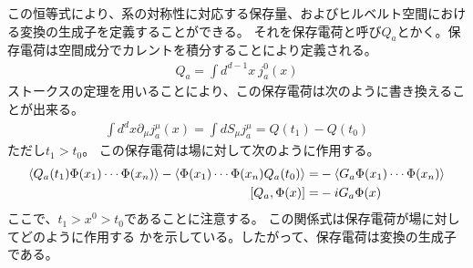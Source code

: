 \documentclass[11pt, dvipdfmx]{article}
\numberwithin{equation}{section}
\begin{document}
この恒等式により、系の対称性に対応する保存量、およびヒルベルト空間における変換の生成子を定義することができる。
それを保存電荷と呼び$Q_a$とかく。保存電荷は空間成分でカレントを積分することにより定義される。
\begin{align}
    Q_a=\int d^{d-1}x \ j_a^0(x)
\end{align}
ストークスの定理を用いることにより、この保存電荷は次のように書き換えることが出来る。
\begin{align}
    \int d^{d}x \partial_\mu j_a^\mu (x)=\int dS_\mu j^\mu_a = Q(t_1)-Q(t_0)
\end{align}
ただし$t_1>t_0$。
この保存電荷は場に対して次のように作用する。
\begin{align}
    \ev{Q_a(t_1)\Phi(x_1)\cdots \Phi(x_n)} - \ev{\Phi(x_1)\cdots \Phi(x_n) Q_a(t_0)}=&-\ev{G_a\Phi(x_1)\cdots \Phi(x_n)}\\
    [Q_a,\Phi(x)]=&-i G_a \Phi(x)
\end{align}
ここで、$t_1> x^0 > t_0$であることに注意する。
この関係式は保存電荷が場に対してどのように作用する
かを示している。したがって、保存電荷は変換の生成子である。
\end{document}
